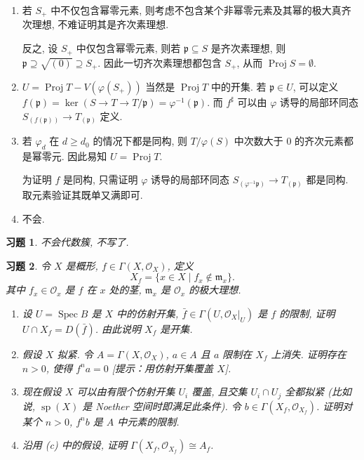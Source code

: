 \documentclass{article}
\theoremstyle{exercise}
\newtheorem{exercise}{习题}[section]
\newenvironment{proofc}{\proof}{\endproof}
\def\gp{\mathfrak{p}}
\def\gm{\mathfrak{m}}
\def\sO{\mathscr{O}}
\def\spp{\operatorname{sp}}
\def\Spec{\operatorname{Spec}}
\def\Proj{\operatorname{Proj}}
\def\geq{\geqslant}
\begin{document}
\begin{proofc}
  \begin{enumerate}[label={(\alph*)}]
    \item 若 $S_+$ 中不仅包含幂零元素,
          则考虑不包含某个非幂零元素及其幂的极大真齐次理想,
          不难证明其是齐次素理想.

          反之, 设 $S_+$ 中仅包含幂零元素, 则若 $\gp \subseteq S$ 是齐次素理想,
          则 $\gp \supseteq \sqrt{(0)} \supseteq S_+$.
          因此一切齐次素理想都包含 $S_+$, 从而 $\Proj S = \emptyset$.
    \item $U = \Proj T - V(\varphi(S_+))$ 当然是 $\Proj T$ 中的开集.
          若 $\gp \in U$, 可以定义 $f(\gp) = \ker (S \to T \to T / \gp) = \varphi^{-1}(\gp)$.
          而 $f^\sharp$ 可以由 $\varphi$ 诱导的局部环同态 $S_{(f(\gp))} \to T_{(\gp)}$ 定义.
    \item 若 $\varphi_d$ 在 $d \geq d_0$ 的情况下都是同构,
          则 $T / \varphi(S)$ 中次数大于 $0$ 的齐次元素都是幂零元.
          因此易知 $U = \Proj T$.

          为证明 $f$ 是同构, 只需证明 $\varphi$ 诱导的局部环同态
          $S_{(\varphi^{-1}\gp)} \to T_{(\gp)}$ 都是同构. 取元素验证其既单又满即可.
    \item 不会.
          \qedhere
  \end{enumerate}
\end{proofc}

\begin{exercise}
  不会代数簇, 不写了.
\end{exercise}

\begin{exercise}
  令 $X$ 是概形, $f \in \Gamma(X, \sO_X)$, 定义
  \[
    X_f = \{ x \in X \mid f_x \notin \gm_x \}.
  \]
  其中 $f_x \in \sO_x$ 是 $f$ 在 $x$ 处的茎, $\gm_x$ 是 $\sO_x$ 的极大理想.
  \begin{enumerate}[label={(\alph*)}]
    \item 设 $U = \Spec B$ 是 $X$ 中的仿射开集, $\bar{f} \in \Gamma(U, \sO_X|_U)$ 是 $f$ 的限制,
          证明 $U \cap X_f = D(\bar{f})$. 由此说明 $X_f$ 是开集.
    \item 假设 $X$ 拟紧. 令 $A = \Gamma(X, \sO_X)$, $a \in A$ 且 $a$ 限制在 $X_f$ 上消失.
          证明存在 $n > 0$, 使得 $f^n a = 0$ [提示：用仿射开集覆盖 $X$].
    \item 现在假设 $X$ 可以由有限个仿射开集 $U_i$ 覆盖, 且交集 $U_i \cap U_j$ 全都拟紧
          (比如说, $\spp(X)$ 是 Noether 空间时即满足此条件).
          令 $b \in \Gamma(X_f, \sO_{X_f})$. 证明对某个 $n > 0$, $f^n b$ 是 $A$ 中元素的限制.
    \item 沿用 (c) 中的假设, 证明 $\Gamma(X_f, \sO_{X_f}) \cong A_f$.
  \end{enumerate}
\end{exercise}
\end{document}
